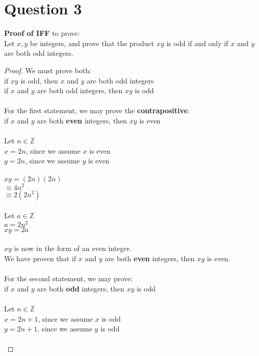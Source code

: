 \documentclass{article}
\begin{document}
    \section*{Question 3}
    \textbf{Proof of IFF} to prove: \\
    \indent Let $x, y$ be integers, and prove that the product $xy$ is odd if and only if $x$ and $y$ are both odd integers. \\
    \begin{proof}
    We must prove both: \\
    \indent if $xy$ is odd, then $x$ and $y$ are both odd integers \\
    \indent if $x$ and $y$ are both odd integers, then $xy$ is odd \\ \\
    For the first statement, we may prove the \textbf{contrapositive}: \\
    \indent if $x$ and $y$ are both \textbf{even} integers, then $xy$ is even \\ \\
    Let $n \in \mathbb{Z}$ \\
    $x = 2n$, since we assume $x$ is even \\
    $y = 2n$, since we assume $y$ is even \\ \\
    $xy = (2n)(2n)$ \\
    $\equiv 4n^2$ \\
    $\equiv 2(2n^2)$ \\ \\
    Let $a \in \mathbb{Z}$ \\
    $a = 2n^2$ \\
    $xy = 2a$ \\ \\
    $xy$ is now in the form of an even integer. \\
    We have proven that if $x$ and $y$ are both \textbf{even} integers, then $xy$ is even. \\ \\
     For the second statement, we may prove: \\
    \indent if $x$ and $y$ are both \textbf{odd} integers, then $xy$ is odd \\ \\
    Let $n \in \mathbb{Z}$ \\
    $x = 2n + 1$, since we assume $x$ is odd \\
    $y = 2n + 1$, since we assume $y$ is odd \\ \\

\end{proof}
\end{document}
